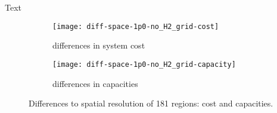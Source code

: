 Text

\begin{figure}
    \centering
    \begin{subfigure}[t]{\textwidth}
        \centering
        \caption{differences in system cost}
        \texttt{[image: diff-space-1p0-no\_H2\_grid-cost]}
        \label{fig:sensitivity-space-cost}
    \end{subfigure}
    \begin{subfigure}[t]{\textwidth}
        \centering
        \caption{differences in capacities}
        \texttt{[image: diff-space-1p0-no\_H2\_grid-capacity]}
        \label{fig:sensitivity-space-cap}
    \end{subfigure}
    \caption{Differences to spatial resolution of 181 regions: cost and capacities.}
    \label{fig:sensitivity-space}
\end{figure}
